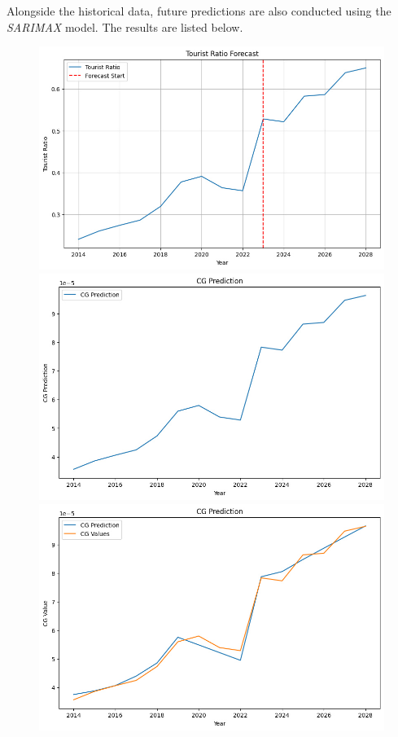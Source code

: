Alongside the historical data, future predictions are also conducted using the \textit{SARIMAX} model.
The results are listed below.

\begin{figure}[H]
    \centering
    \begin{minipage}{0.32\textwidth}
        \centering
        \includegraphics[width=\textwidth]{Ratio.jpg}
    \end{minipage}
    \begin{minipage}{0.32\textwidth}
        \centering
        \includegraphics[width=\textwidth]{CG_pred.jpg}
    \end{minipage}
    \begin{minipage}{0.32\textwidth}
        \centering
        \includegraphics[width=\textwidth]{CG_pred2.jpg}

\end{minipage}
\end{figure}
